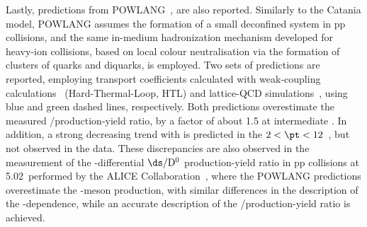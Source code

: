 Lastly, predictions from POWLANG~\cite{Beraudo:2023nlq}, are also reported. Similarly to the Catania model, POWLANG assumes the formation of a small deconfined system in pp collisions, and the same in-medium hadronization mechanism developed for heavy-ion collisions, based on local colour neutralisation via the formation of clusters of quarks and diquarks, is employed. Two sets of predictions are reported, employing transport coefficients calculated with weak-coupling calculations~\cite{Braaten:1989mz} (Hard-Thermal-Loop, HTL) and lattice-QCD simulations~\cite{Altenkort:2023oms}, using blue and green dashed lines, respectively. Both predictions overestimate the measured \ds/\dpl production-yield ratio, by a factor of about 1.5 at intermediate \pt. In addition, a strong decreasing trend with \pt is predicted in the $2<\pt<12$~\gevc, but not observed in the data. These discrepancies are also observed in the measurement of the \pt-differential $\ds/\mathrm{D^0}$ production-yield ratio in pp collisions at 5.02~\tev performed by the ALICE Collaboration~\cite{Beraudo:2023nlq}, where the POWLANG predictions overestimate the \ds-meson production, with similar differences in the description of the \pt-dependence, while an accurate description of the \dpl/\dz production-yield ratio is achieved.








